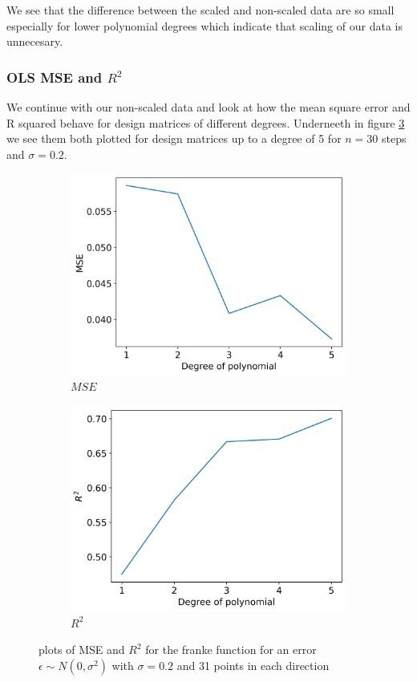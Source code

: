 \documentclass[12pt]{article}
\begin{document}
We see that the difference between the scaled and non-scaled data are so small especially for lower polynomial degrees which indicate that scaling of our data is unnecesary.

\subsubsection{OLS MSE and $R^2$}

We continue with our non-scaled data and look at how the mean square error and R squared behave for design matrices of different degrees. Underneeth in figure \ref{fig:r2_mse_5} we see them both plotted for design matrices up to a degree of 5 for $n=30$ steps and $\sigma=0.2$.
\begin{figure}[H]
  \begin{subfigure}{.5\textwidth}
    \centering
    \includegraphics[width=\textwidth]{../figures/mse_ols_5.png}
    \caption{$MSE$}
    \label{fig:}
  \end{subfigure}
  \begin{subfigure}{.5\textwidth}
    \centering
    \includegraphics[width=\textwidth]{../figures/r2_ols_5.png}
    \caption{$R^2$}
    \label{fig:}
  \end{subfigure}
  \caption{plots of MSE and $R^2$ for the franke function for an error $\epsilon \sim N(0, \sigma^2)$ with $\sigma=0.2$ and 31 points in each direction}
  \label{fig:r2_mse_5}
\end{figure}
\end{document}

